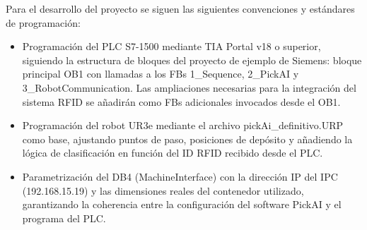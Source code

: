 Para el desarrollo del proyecto se siguen las siguientes convenciones y estándares de programación:
\begin{itemize}
	\item Programación del PLC S7-1500 mediante TIA Portal v18 o superior, siguiendo la estructura de bloques del proyecto de ejemplo de Siemens: bloque principal OB1 con llamadas a los FBs 1\_Sequence, 2\_PickAI y 3\_RobotCommunication. Las ampliaciones necesarias para la integración del sistema RFID se añadirán como FBs adicionales invocados desde el OB1.

	\item Programación del robot UR3e mediante el archivo pickAi\_definitivo.URP como base, ajustando puntos de paso, posiciones de depósito y añadiendo la lógica de clasificación en función del ID RFID recibido desde el PLC.

	\item Parametrización del DB4 (MachineInterface) con la dirección IP del IPC (192.168.15.19) y las dimensiones reales del contenedor utilizado, garantizando la coherencia entre la configuración del software PickAI y el programa del PLC.
\end{itemize}
